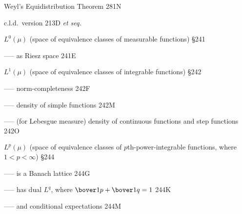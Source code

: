 Weyl's Equidistribution Theorem 281N




\indexmedskip




c.l.d.\ version 213D {\it et seq.}





























$L^0(\mu)$ (space of equivalence classes of measurable functions) \S241

----- as Riesz space 241E





















$L^1(\mu)$ (space of equivalence classes of integrable functions) \S242


----- norm-completeness 242F

----- density of simple functions 242M

----- (for Lebesgue measure) density of continuous functions and step functions 242O
















$L^p(\mu)$ (space of equivalence classes of $p$th-power-integrable
functions, where $1<p<\infty$) \S244


----- is a Banach lattice 244G

----- has dual $L^q$, where $\bover1p+\bover1q=1$ 244K

----- and conditional expectations 244M









